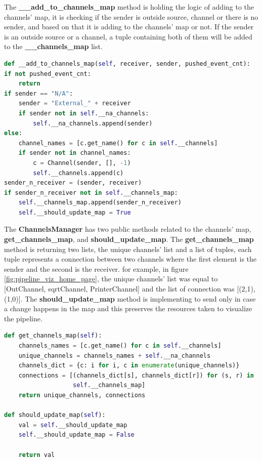 The \textbf{\_\_add\_to\_channels\_map} method is holding the logic of adding to the channels' map,
it is checking if the sender is outside source, channel or there is no sender, and based on that it is adding
to the channels' map or not. If the sender is an outside source or a channel, a tuple containing both of them
will be added to the \textbf{\_\_channels\_map} list.
\newline
\begin{lstlisting}[language=python, caption={add to channels' map},captionpos=b]
def __add_to_channels_map(self, receiver, sender, pushed_event_cnt):
if not pushed_event_cnt:
	return
if sender == "N/A":
	sender = "External_" + receiver
	if sender not in self.__na_channels:
		self.__na_channels.append(sender)
else:
	channel_names = [c.get_name() for c in self.__channels]
	if sender not in channel_names:
		c = Channel(sender, [], -1)
		self.__channels.append(c)
sender_n_receiver = (sender, receiver)
if sender_n_receiver not in self.__channels_map:
	self.__channels_map.append(sender_n_receiver)
	self.__should_update_map = True	
\end{lstlisting}

The \textbf{ChannelsManager} has two public methods related to the channels' map, \textbf{get\_channels\_map}, 
and \textbf{should\_update\_map}. The \textbf{get\_channels\_map} method is returning two lists, the unique channels'
list and a list of tuples, each tuple represents a connection between two channels where the first element
is the sender and the second is the receiver. for example, in figure \ref{fig:pipeline_viz_home_page}, the unique
channels' list was equal to [OutChannel, sqrtChannel, PrinterChannel] and the list of connection was 
[(2,1),(1,0)]. The \textbf{should\_update\_map} method is implementing to send only in case a change happens
in the map and this preserves the resources taken to visualize the pipeline.
\newline
\begin{lstlisting}[language=python, caption={public methods for channels' map},captionpos=b]
def get_channels_map(self):
	channels_names = [c.get_name() for c in self.__channels]
	unique_channels = channels_names + self.__na_channels
	channels_dict = {c: i for i, c in enumerate(unique_channels)}
	connections = [(channels_dict[s], channels_dict[r]) for (s, r) in
				   self.__channels_map]
	return unique_channels, connections

def should_update_map(self):
	val = self.__should_update_map
	self.__should_update_map = False

	return val
\end{lstlisting}

